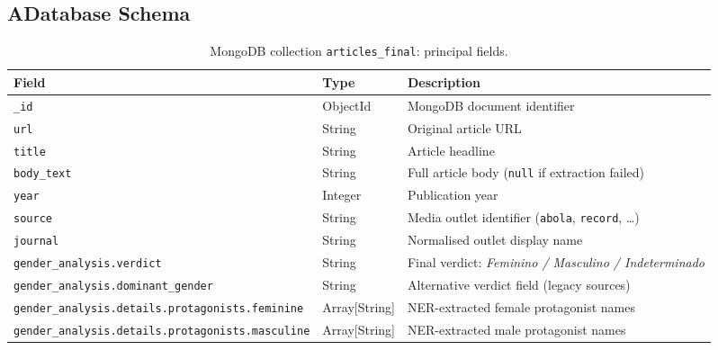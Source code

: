 \documentclass[11pt,a4paper]{article}
\begin{document}
\label{app:schema}
\subsection*{A\quad Database Schema}

\begin{table}[H]
\centering\small
\caption{MongoDB collection \texttt{articles\_final}: principal fields.}
\label{tab:schema_articles}
\begin{tabularx}{\textwidth}{p{5.5cm}lX}
\toprule
\textbf{Field} & \textbf{Type} & \textbf{Description} \\
\midrule
\texttt{\_id}            & ObjectId & MongoDB document identifier \\
\texttt{url}             & String   & Original article URL \\
\texttt{title}           & String   & Article headline \\
\texttt{body\_text}      & String   & Full article body (\texttt{null} if extraction failed) \\
\texttt{year}            & Integer  & Publication year \\
\texttt{source}          & String   & Media outlet identifier (\texttt{abola}, \texttt{record}, \dots) \\
\texttt{journal}         & String   & Normalised outlet display name \\
\texttt{gender\_analysis.verdict}    & String & Final verdict: \textit{Feminino / Masculino / Indeterminado} \\
\texttt{gender\_analysis.\newline dominant\_gender} & String & Alternative verdict field (legacy sources) \\
\texttt{gender\_analysis.details.\newline protagonists.feminine} & Array[String] & NER-extracted female protagonist names \\
\texttt{gender\_analysis.details.\newline protagonists.masculine} & Array[String] & NER-extracted male protagonist names \\
\bottomrule
\end{tabularx}
\end{table}
\end{document}
